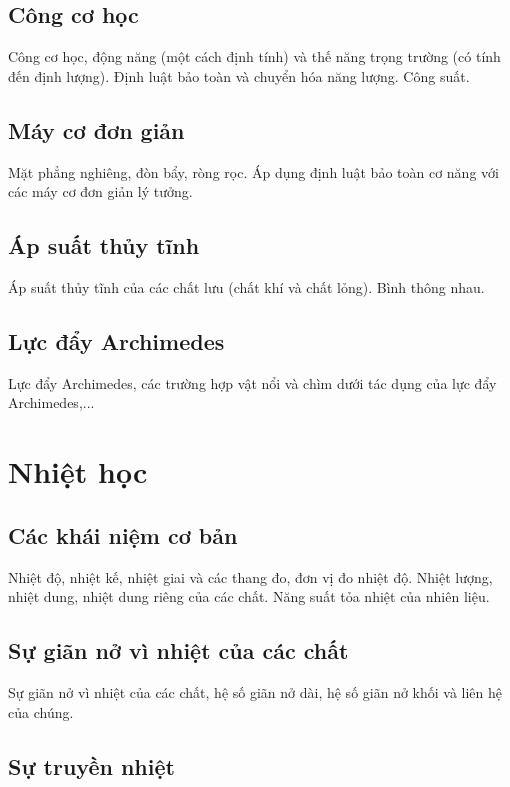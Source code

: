 \documentclass{article}
\begin{document}
\begin{multicols}{2}
\subsection{Công cơ học}

Công cơ học, động năng (một cách định tính) và thế năng trọng trường (có tính đến định lượng). Định luật bảo toàn và chuyển hóa năng lượng. Công suất.

\subsection{Máy cơ đơn giản}

Mặt phẳng nghiêng, đòn bẩy, ròng rọc. Áp dụng định luật bảo toàn cơ năng với các máy cơ đơn giản lý tưởng.

\subsection{Áp suất thủy tĩnh}

Áp suất thủy tĩnh của các chất lưu (chất khí và chất lỏng). Bình thông nhau.

\subsection{Lực đẩy Archimedes}

Lực đẩy Archimedes, các trường hợp vật nổi và chìm dưới tác dụng của lực đẩy Archimedes,...

\section{Nhiệt học}

\subsection{Các khái niệm cơ bản}

Nhiệt độ, nhiệt kế, nhiệt giai và các thang đo, đơn vị đo nhiệt độ. Nhiệt lượng, nhiệt dung, nhiệt dung riêng của các chất. Năng suất tỏa nhiệt của nhiên liệu.

\subsection{Sự giãn nở vì nhiệt của các chất}

Sự giãn nở vì nhiệt của các chất, hệ số giãn nở dài, hệ số giãn nở khối và liên hệ của chúng.

\subsection{Sự truyền nhiệt}


\end{multicols}
\end{document}

